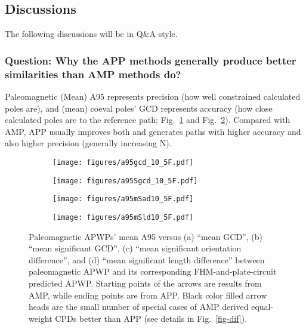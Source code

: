 \subsection{Discussions}

The following discussions will be in Q\&A style.

\subsubsection{Question: Why the APP methods generally produce better
similarities than AMP methods do?}

Paleomagnetic (Mean) A95 represents precision (how well constrained calculated
poles are), and (mean) coeval poles' GCD represents accuracy (how close
calculated poles are to the reference path; Fig.~\ref{fig-A95GCD105F} and
Fig.~\ref{fig-A95SGCD105F}). Compared with AMP, APP usually improves both and
generates paths with higher accuracy and also higher precision (generally
increasing N).

\begin{figure}
\captionsetup[subfigure]{singlelinecheck=off,justification=raggedright,aboveskip=-6pt,belowskip=-6pt}
\centering
  \begin{subfigure}[htbp]{.49\textwidth}
	\caption{}\texttt{[image: figures/a95gcd\_10\_5F.pdf]}\label{fig-A95GCD105F}
  \end{subfigure}
  \begin{subfigure}[htbp]{.49\textwidth}
	\caption{}\texttt{[image: figures/a95Sgcd\_10\_5F.pdf]}\label{fig-A95SGCD105F}
  \end{subfigure}
  \begin{subfigure}[htbp]{.49\textwidth}
	\caption{}\texttt{[image: figures/a95mSad10\_5F.pdf]}\label{fig-A95mSad105F}
  \end{subfigure}
  \begin{subfigure}[htbp]{.49\textwidth}
	\caption{}\texttt{[image: figures/a95mSld10\_5F.pdf]}\label{fig-A95mSld105F}
  \end{subfigure}
\caption[APP spatially better than AMP]{Paleomagnetic APWPs' mean A95 versus
(a) ``mean GCD'', (b) ``mean significant GCD'', (c) ``mean significant
orientation difference'', and (d) ``mean significant length difference'' between
paleomagnetic APWP and its corresponding FHM-and-plate-circuit predicted APWP\@.
Starting points of the arrows are results from AMP, while ending points are from
APP\@. Black color filled arrow heads are the small number of special cases of
AMP derived equal-weight CPDs better than APP (see details in
Fig.~\ref{fig-dif}).}\label{fig-A95mG105F}
\end{figure}

